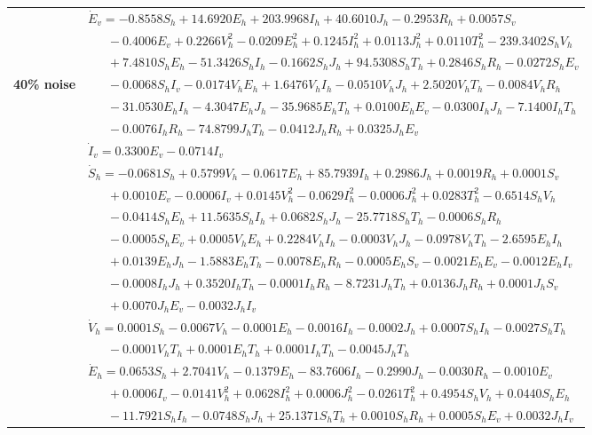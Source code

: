 \documentclass[9pt]{article}
\numberwithin{equation}{section}
\begin{document}
\begin{table}[ht]
    \begin{tabularx}{1\linewidth}{|l|X|} 
        & $\dot{E}_v=-0.8558S_h+14.6920E_h+203.9968I_h+40.6010J_h-0.2953R_h+0.0057S_v$ \\
        & $\quad\;\;-0.4006E_v+0.2266V_h^2-0.0209E_h^2+0.1245I_h^2+0.0113J_h^2+0.0110T_h^2-239.3402S_hV_h$ \\
        & $\quad\;\;+7.4810S_hE_h-51.3426S_hI_h-0.1662S_hJ_h+94.5308S_hT_h+0.2846S_hR_h-0.0272S_hE_v$ \\
        \textbf{40\% noise} & $\quad\;\;-0.0068S_hI_v-0.0174V_hE_h+1.6476V_hI_h-0.0510V_hJ_h+2.5020V_hT_h-0.0084V_hR_h$ \\
        & $\quad\;\;-31.0530E_hI_h-4.3047E_hJ_h-35.9685E_hT_h+0.0100E_hE_v-0.0300I_hJ_h-7.1400I_hT_h$ \\
        & $\quad\;\;-0.0076I_hR_h-74.8799J_hT_h-0.0412J_hR_h+0.0325J_hE_v$ \\
        & $\dot{I}_v=0.3300E_v-0.0714I_v$ \\
        \hline\hline
        & $\dot{S}_h=-0.0681S_h+0.5799V_h-0.0617E_h+85.7939I_h+0.2986J_h+0.0019R_h+0.0001S_v$ \\
        & $\quad\;\;+0.0010E_v-0.0006I_v+0.0145V_h^2-0.0629I_h^2-0.0006J_h^2+0.0283T_h^2-0.6514S_hV_h$ \\
        & $\quad\;\;-0.0414S_hE_h+11.5635S_hI_h+0.0682S_hJ_h-25.7718S_hT_h-0.0006S_hR_h$ \\
        & $\quad\;\;-0.0005S_hE_v+0.0005V_hE_h+0.2284V_hI_h-0.0003V_hJ_h-0.0978V_hT_h-2.6595E_hI_h$ \\
        & $\quad\;\;+0.0139E_hJ_h-1.5883E_hT_h-0.0078E_hR_h-0.0005E_hS_v-0.0021E_hE_v-0.0012E_hI_v$ \\
        & $\quad\;\;-0.0008I_hJ_h+0.3520I_hT_h-0.0001I_hR_h-8.7231J_hT_h+0.0136J_hR_h+0.0001J_hS_v$ \\
        & $\quad\;\;+0.0070J_hE_v-0.0032J_hI_v$ \\
        & $\dot{V}_h=0.0001S_h-0.0067V_h-0.0001E_h-0.0016I_h-0.0002J_h+0.0007S_hI_h-0.0027S_hT_h$ \\
        & $\quad\;\;-0.0001V_hT_h+0.0001E_hT_h+0.0001I_hT_h-0.0045J_hT_h$ \\
        & $\dot{E}_h=0.0653S_h+2.7041V_h-0.1379E_h-83.7606I_h-0.2990J_h-0.0030R_h-0.0010E_v$ \\
        & $\quad\;\;+0.0006I_v-0.0141V_h^2+0.0628I_h^2+0.0006J_h^2-0.0261T_h^2+0.4954S_hV_h+0.0440S_hE_h$ \\
        & $\quad\;\;-11.7921S_hI_h-0.0748S_hJ_h+25.1371S_hT_h+0.0010S_hR_h+0.0005S_hE_v+0.0032J_hI_v$ \\

\end{tabularx}
\end{table}
\end{document}
